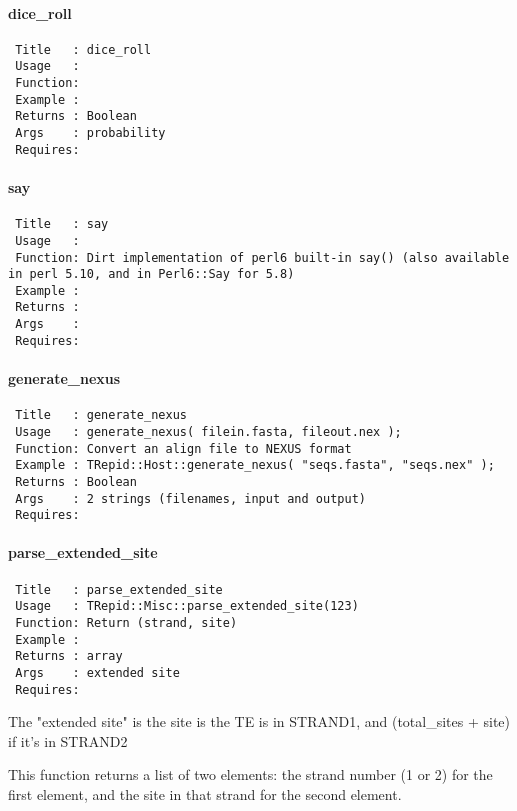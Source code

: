 \paragraph*{dice\_roll\label{dice_roll}}
\begin{verbatim}
 Title   : dice_roll
 Usage   : 
 Function: 
 Example : 
 Returns : Boolean
 Args    : probability
 Requires:
\end{verbatim}
\paragraph*{say\label{say}}
\begin{verbatim}
 Title   : say
 Usage   : 
 Function: Dirt implementation of perl6 built-in say() (also available in perl 5.10, and in Perl6::Say for 5.8)
 Example : 
 Returns : 
 Args    : 
 Requires:
\end{verbatim}
\paragraph*{generate\_nexus\label{generate_nexus}}
\begin{verbatim}
 Title   : generate_nexus
 Usage   : generate_nexus( filein.fasta, fileout.nex );
 Function: Convert an align file to NEXUS format
 Example : TRepid::Host::generate_nexus( "seqs.fasta", "seqs.nex" );
 Returns : Boolean
 Args    : 2 strings (filenames, input and output)
 Requires:
\end{verbatim}
\paragraph*{parse\_extended\_site\label{parse_extended_site}}
\begin{verbatim}
 Title   : parse_extended_site
 Usage   : TRepid::Misc::parse_extended_site(123)
 Function: Return (strand, site)
 Example :
 Returns : array
 Args    : extended site
 Requires:
\end{verbatim}


The "extended site" is the site is the TE is in STRAND1, and (total\_sites
+ site) if it's in STRAND2



This function returns a list of two elements: the strand number (1 or
2) for the first element, and the site in that strand for the second
element.

